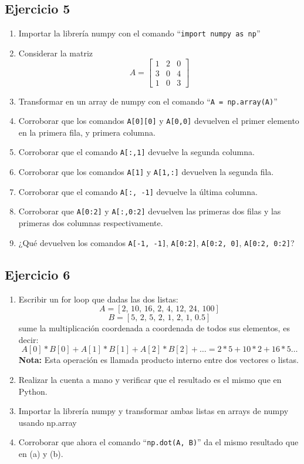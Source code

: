 \documentclass[12pt]{article}
\begin{document}
\subsection{Ejercicio 5}

\begin{enumerate}[label=\alph*)]
    \item Importar la librería numpy con el comando ``\texttt{import numpy as np}''
    \item Considerar la matriz  
    \[
    A = \begin{bmatrix}
    1 & 2 & 0\\[4pt]
    3 & 0 & 4\\[4pt]
    1 & 0 & 3
    \end{bmatrix}
    \]
    \item Transformar en un array de numpy con el comando ``\texttt{A = np.array(A)}''
    \item Corroborar que los comandos \texttt{A[0][0]} y \texttt{A[0,0]} devuelven el primer elemento en la primera fila, y primera columna.
    \item Corroborar que el comando \texttt{A[:,1]} devuelve la segunda columna.
    \item Corroborar que los comandos \texttt{A[1]} y \texttt{A[1,:]} devuelven la segunda fila.
    \item Corroborar que el comando \texttt{A[:, -1]} devuelve la última columna.
    \item Corroborar que \texttt{A[0:2]} y \texttt{A[:,0:2]} devuelven las primeras dos filas y las primeras dos columnas respectivamente.
    \item ¿Qué devuelven los comandos \texttt{A[-1, -1]}, \texttt{A[0:2]}, \texttt{A[0:2, 0]}, \texttt{A[0:2, 0:2]}?
\end{enumerate}

    
\subsection{Ejercicio 6}
\begin{enumerate}[label=\alph*)]
    \item Escribir un for loop que dadas las dos listas:
    \[
    A = [2,\, 10,\, 16,\, 2,\, 4,\, 12,\, 24,\, 100]
    \]
    \[
    B = [5,\, 2,\, 5,\, 2,\, 1,\, 2,\, 1,\, 0.5]
    \]
    sume la multiplicación coordenada a coordenada de todos sus elementos, es decir:
    \[
    A[0]*B[0] + A[1]*B[1] + A[2]*B[2] + \dots = 2*5 + 10*2 + 16*5 \dots
    \]
    \textbf{Nota: }Esta operación es llamada producto interno entre dos vectores o listas.
    \item Realizar la cuenta a mano y verificar que el resultado es el mismo que en Python.
    \item Importar la librería numpy y transformar ambas listas en arrays de numpy usando np.array
    \item Corroborar que ahora el comando ``\texttt{np.dot(A, B)}'' da el mismo resultado que en (a) y (b).
\end{enumerate}
    
\end{document}
